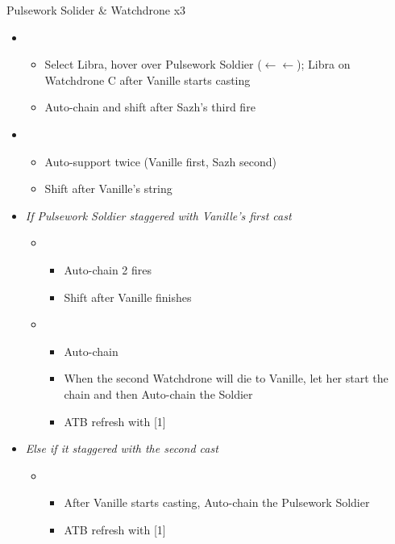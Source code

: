 \begin{battle}{Pulsework Solider \& Watchdrone x3}
\begin{itemize}
    \item \fourth
    \begin{itemize}
        \item Select Libra, hover over Pulsework Soldier ($\leftarrow\leftarrow$); Libra on Watchdrone C after Vanille starts casting
        \item Auto-chain and shift after Sazh's third fire
    \end{itemize}
    \item \second
    \begin{itemize}
        \item Auto-support twice (Vanille first, Sazh second)
        \item Shift after Vanille's string
    \end{itemize}
    \item \textit{If Pulsework Soldier staggered with Vanille's first cast}
    \begin{itemize}
        \item \first
        \begin{itemize}
            \item Auto-chain 2 fires
            \item Shift after Vanille finishes
        \end{itemize}
        \item \fifth
        \begin{itemize}
            \item Auto-chain
            \item When the second Watchdrone will die to Vanille, let her start the chain and then Auto-chain the Soldier
            \item ATB refresh with [1]
        \end{itemize}
    \end{itemize}
    \item \textit{Else if it staggered with the second cast}
    \begin{itemize}
        \item \first
        \begin{itemize}
            \item After Vanille starts casting, Auto-chain the Pulsework Soldier
            \item ATB refresh with [1]
        \end{itemize}
    \end{itemize}
\end{itemize}
\end{battle}

